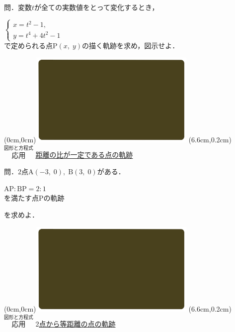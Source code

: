 \documentclass[10pt,
fleqn,
dvipdfmx,
uplatex
]{jsarticle}
\begin{document}
\small
問．変数$t$が全ての実数値をとって変化するとき，

\huge
\vspace{0.2zw}
$\left\{\begin{array}{l}x=t^2-1,\;\\y=t^4+4t^2-1\end{array}\right.$\\

\small
\vspace{-0.1zw}
\hfill で定められる点$\text{P}\left(x,\;y\right)$の描く軌跡を求め，図示せよ．
\newpage

\at(0cm,0cm){\includegraphics[width=8cm,bb=0 0 1920 1080]{./youtube/thumbnails/templates/smart_background/図形と方程式.jpeg}}
\at(6.6cm,0.2cm){\small\color{bradorange}$\overset{\text{図形と方程式}}{\text{応用}}$}
{\color{orange}\large\underline{距離の比が一定である点の軌跡}}\vspace{0.3zw}

\large 
問．$2$点$\text{A}\left(-3,\;0\right),\;\text{B}\left(3,\;0\right)$がある．

\huge
\vspace{-0.0zw}
\hspace{0.5zw}$\text{AP}:\text{BP}=2:1$\vspace{-0.0zw}\\
\hfill を満たす点$\text{P}$の軌跡\hspace{0.4zw}

\large 
\vspace{0.2zw}
\hfill を求めよ．

\newpage

\at(0cm,0cm){\includegraphics[width=8cm,bb=0 0 1920 1080]{./youtube/thumbnails/templates/smart_background/図形と方程式.jpeg}}
\at(6.6cm,0.2cm){\small\color{bradorange}$\overset{\text{図形と方程式}}{\text{応用}}$}
{\color{orange}\Large\underline{$2$点から等距離の点の軌跡}}\vspace{0.3zw}
\end{document}
